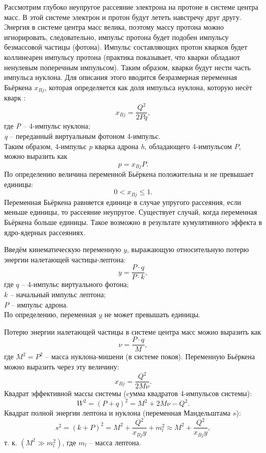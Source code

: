 \documentclass{extarticle}
\begin{document}
Рассмотрим глубоко неупругое рассеяние электрона на протоне в системе центра масс. В этой системе электрон и протон будут лететь навстречу друг другу. Энергия в системе центра масс велика, поэтому массу протона можно игнорировать, следовательно, импульс протона будет подобен импульсу безмассовой частицы (фотона). Импульс составляющих протон кварков будет коллинеарен импульсу протона (практика показывает, что кварки обладают ненулевым поперечным импульсом). Таким образом, кварки будут нести часть импульса нуклона. Для описания этого вводится безразмерная переменная Бьёркена $x_{Bj}$, которая определяется как доля импульса нуклона, которую несёт кварк \cite{Metz_2016}:
\begin{equation}
    x_{Bj}= \frac{Q^2}{2Pq},
\end{equation}
где \textit{P} -- 4-импульс нуклона; \\ \textit{q} -- переданный виртуальным фотоном 4-импульс. \\
Таким образом, 4-импульс \textit{p} кварка адрона \textit{h}, обладающего 4-импульсом $P$, можно выразить как
\begin{equation}
    p=x_{Bj}P.
\end{equation}
По определению величина переменной Бьёркена положительна и не превышает единицы: 
\begin{equation}
    0 < x_{Bj} \leq 1.
\end{equation}
Переменная Бьёркена равняется единице в случае упругого рассеяния, если меньше единицы, то рассеяние неупругое. Существует случай, когда переменная Бьёркена больше единицы. Такое возможно в результате кумулятивного эффекта в ядро-ядерных рассеяниях.

Введём кинематическую переменную $y$, выражающую относительную потерю энергии налетающей частицы-лептона:
\begin{equation}
    y = \frac{P \cdot q}{P \cdot k},
\end{equation}
где $q$ -- 4-импульс виртуального фотона; \\ $k$ -- начальный импульс лептона; \\ $P$ -- импульс адрона. \\ По определению, переменная $y$ не может превышать единицы.

Потерю энергии налетающей частицы в системе центра масс можно выразить как 
\begin{equation}
    \nu = \frac{P \cdot q}{M},
\end{equation}
где $M^2 = P^2$ -- масса нуклона-мишени (в системе покоя). Переменную Бьёркена можно выразить через эту величину:
\begin{equation}
    x_{Bj} = \frac{Q^2}{2M\nu}.
\end{equation}
Квадрат эффективной массы системы (cумма квадратов 4-импульсов системы):
\begin{equation}
	W^2 = (P+q)^2 = M^2 + 2M\nu - Q^2.
\end{equation}
Квадрат полной энергии лептона и нуклона (переменная Мандельштама $s$):
\begin{equation}
	s^2 = (k+P)^2 = M^2 + \frac{Q^2}{x_{Bj}y} + m_l^2 \approx M^2 + \frac{Q^2}{x_{Bj}y}, 
\end{equation}
т. к. $(M^2 \gg m_l^2)$, где $m_l$ -- масса лептона. 
\end{document}
